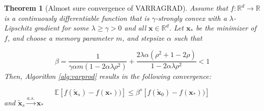 \documentclass[11pt] {article}
\newcommand{\x}{\pmb{x}}
\newcommand{\Expectation}{\mathbb{E}}
\newcommand{\convas}{\overset{a.s.}{\longrightarrow}}
\newcommand{\reals}{\mathbb{R}}
\newtheorem{theorem}{Theorem}
\begin{document}
\begin{theorem}[Almost sure convergence of VARRAGRAD]\label{thm:VarianceReducedRandomGradient}
Assume that $f: \reals^d \to \reals$ is a continuously differentiable function that is $\gamma$-strongly convex with a $\lambda$-Lipschitz gradient for some $\lambda \geq \gamma > 0$ and all $\x \in \reals^d$.	Let $\x_*$ be the minimizer of $f$, and choose a memory parameter $m$, and stepsize $\alpha$ such that
	
	\begin{equation*}
	\beta = \frac{1}{\gamma\alpha m (1-2\alpha \lambda \rho^2)} + \frac{2\lambda\alpha (\rho^2 + 1-2\rho)}{1-2\alpha \lambda \rho^2}<1	\end{equation*}
%
	Then, Algorithm \ref{alg:varprod} results in the following convergence:
	 
	\begin{equation}\label{goal}
	\Expectation \left[f(\tilde{\x}_s) - f(\x_*))\right] \leq \beta^s \left[f(\tilde{\x}_0) - f(\x_*))\right]
	\end{equation}
	and $\tilde{\x}_s \convas \x_*$
\end{theorem}
\end{document}
